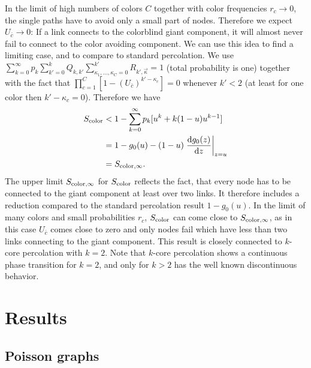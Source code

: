 \documentclass[aps, pre, onecolumn, a4paper, floatfix]{revtex4}
\begin{document}
In the limit of high numbers of colors $C$ together with color frequencies $r_c \to 0$, the 
single paths have to avoid only a small part of nodes. Therefore we expect $U_{\bar c}\to 0$: If a 
link connects to the colorblind giant component, it will almost never fail to connect to 
the color avoiding component. We can use this idea to find a limiting case, and to compare 
to standard percolation. We use $\sum_{k=0}^{\infty}p_k \sum_{k'=0}^{k} Q_{k,k'} 
\sum_{\kappa_1,\dots, \kappa_C=0}^{k'} R_{k',\vec \kappa} = 1$ (total probability is one) together with 
the fact that $\prod_{c=1}^C [1-(U_{\bar c})^{k'-\kappa_c}]=0$ whenever $k'<2$ (at least for one 
color then $k'-\kappa_c=0$). Therefore we have 
%
\begin{align}
S_{\rm color} &< 1-\sum_{k=0}^{\infty}p_k [u^k +k (1-u) u^{k-1}]\\
 &= 1 - g_0(u) - (1-u) \left.\frac{{\rm d}g_0(z)}{{\rm d}z}\right|_{z=u}\\
 &= S_{{\rm color},\infty}.
\end{align}
%
The upper limit $S_{{\rm color},\infty}$ for $S_{\rm color}$ reflects the fact, that every node has to be 
connected to the giant component at least over two links. It therefore includes a reduction 
compared to the standard percolation result $1-g_0(u)$. In the limit of many colors and small 
probabilities $r_c$, $S_{\rm color}$ can come close to $S_{{\rm color},\infty}$, as in this case $U_{\bar c}$ comes 
close to zero and only nodes fail which have less than two links connecting to the giant component. 
This result is closely connected to $k$-core percolation with $k=2$. Note that $k$-core percolation shows 
a continuous phase transition for $k=2$, and only for $k>2$ has the well known discontinuous behavior. 


\section{Results}

\subsection{Poisson graphs}
\end{document}
